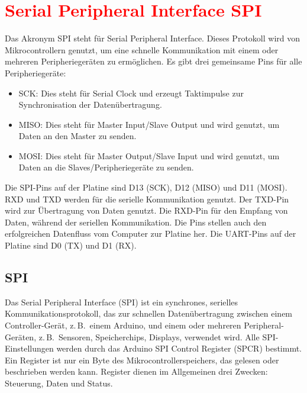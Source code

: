 %
%
%

\chapter{\textcolor{red}{Serial Peripheral Interface SPI}}\label{SPI}

Das Akronym SPI steht für Serial Peripheral Interface. Dieses Protokoll wird von Mikrocontrollern genutzt, um eine schnelle Kommunikation mit einem oder mehreren Peripheriegeräten zu ermöglichen. Es gibt drei gemeinsame Pins für alle Peripheriegeräte:

\begin{itemize}
  \item SCK: Dies steht für Serial Clock und erzeugt Taktimpulse zur Synchronisation der Datenübertragung.
  \item MISO: Dies steht für Master Input/Slave Output und wird genutzt, um Daten an den Master zu senden.
  \item MOSI: Dies steht für Master Output/Slave Input und wird genutzt, um Daten an die Slaves/Peripheriegeräte zu senden.
\end{itemize}


Die SPI-Pins auf der Platine sind D13 (SCK), D12 (MISO) und D11 (MOSI). RXD und TXD werden für die serielle Kommunikation genutzt.
Der TXD-Pin wird zur Übertragung von Daten genutzt. Die RXD-Pin für den Empfang von Daten, während der seriellen Kommunikation. Die Pins stellen auch den erfolgreichen Datenfluss vom Computer zur Platine her. Die UART-Pins auf der Platine sind D0 (TX) und D1 (RX).

\section{SPI}

Das Serial Peripheral Interface (SPI) ist ein synchrones, serielles Kommunikationsprotokoll, das zur schnellen Datenübertragung zwischen einem Controller-Gerät, z.\,B.\ einem Arduino, und einem oder mehreren Peripheral-Geräten, z.\,B.\ Sensoren, Speicherchips, Displays, verwendet wird. Alle SPI-Einstellungen werden durch das Arduino SPI Control Register (SPCR) bestimmt. Ein Register ist nur ein Byte des Mikrocontrollerspeichers, das gelesen oder beschrieben werden kann. Register dienen im Allgemeinen drei Zwecken: Steuerung, Daten und Status.  \cite{Arduino:2024SPI} \cite{Arduino:2022SPI}

